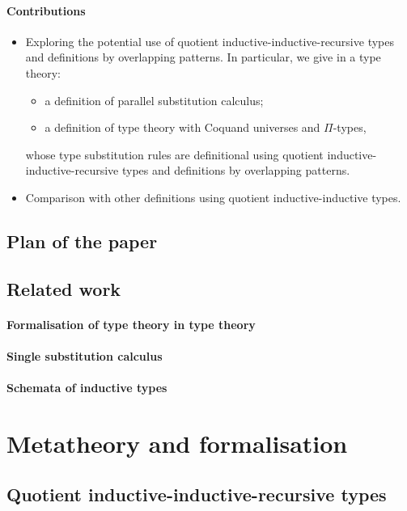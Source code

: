\documentclass[a4paper,UKenglish,numberwithinsect,cleveref,thm-restate]{lipics-v2021}
\begin{document}
\paragraph*{Contributions}
\begin{itemize}
  \item Exploring the potential use of quotient inductive-inductive-recursive types and definitions by overlapping patterns.
    In particular, we give in a type theory:
    \begin{itemize}
      \item a definition of parallel substitution calculus;
      \item a definition of type theory with Coquand universes and $\Pi$-types,
    \end{itemize}
   whose type substitution rules are definitional using quotient inductive-inductive-recursive types and definitions by overlapping patterns.
  \item Comparison with other definitions using quotient inductive-inductive types.
\end{itemize}

\subsection{Plan of the paper}
\subsection{Related work}
\paragraph*{Formalisation of type theory in type theory}
\cite{Danielsson2006}
\paragraph*{Single substitution calculus}
\cite{Kaposi2023,Kaposi2024a}
\paragraph*{Schemata of inductive types}
\cite{Altenkirch2016a,Kaposi2019}
\cite{Dybjer2003,Dybjer2000,Dybjer1999}

\section{Metatheory and formalisation}
\cite{Pujet2022,Pujet2024,Pujet2022a}

\subsection{Quotient inductive-inductive-recursive types}
\end{document}
